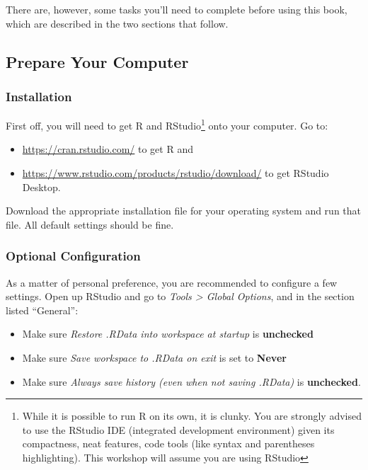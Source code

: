 \documentclass[]{book}
\providecommand{\tightlist}{%
  \setlength{\itemsep}{0pt}\setlength{\parskip}{0pt}}
\let\rmarkdownfootnote\footnote%
\def\footnote{\protect\rmarkdownfootnote}
\begin{document}
There are, however, some tasks you'll need to complete before using this book, which are described in the two sections that follow.

\hypertarget{comp-prep}{%
\subsection*{Prepare Your Computer}\label{comp-prep}}

\hypertarget{install}{%
\subsubsection*{Installation}\label{install}}

First off, you will need to get R and RStudio\footnote{While it is possible to run R on its own, it is clunky. You are strongly advised to use the RStudio IDE (integrated development environment) given its compactness, neat features, code tools (like syntax and parentheses highlighting). This workshop will assume you are using RStudio} onto your computer. Go to:

\begin{itemize}
\tightlist
\item
  \url{https://cran.rstudio.com/} to get R and
\item
  \url{https://www.rstudio.com/products/rstudio/download/} to get RStudio Desktop.
\end{itemize}

Download the appropriate installation file for your operating system and run that file. All default settings should be fine.

\hypertarget{optional-configuration}{%
\subsubsection*{Optional Configuration}\label{optional-configuration}}

As a matter of personal preference, you are recommended to configure a few settings. Open up RStudio and go to \emph{Tools \textgreater{} Global Options}, and in the section listed ``General'':

\begin{itemize}
\tightlist
\item
  Make sure \emph{Restore .RData into workspace at startup} is \textbf{unchecked}
\item
  Make sure \emph{Save workspace to .RData on exit} is set to \textbf{Never}
\item
  Make sure \emph{Always save history (even when not saving .RData)} is \textbf{unchecked}.
\end{itemize}
\end{document}
